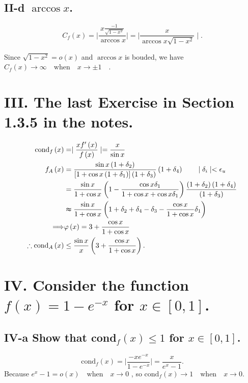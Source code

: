\documentclass[twoside,a4paper]{article}
\begin{document}
\subsection*{II-d \small{$\arccos x$.}}
\[
	C_f\left( x \right)= \mid \frac{x \frac{-1}{\sqrt{1-x^{2}} }}{\arccos x} \mid = \mid \frac{x}{\arccos x \sqrt{1-x^{2}} } \mid 
.\] 

Since $\sqrt{1-x^{2}}=o\left( x \right)  $ and $\arccos x$ is bouded, we have $C_f\left( x \right) \to\infty 
\quad \mathrm{when} \quad x\to \pm 1\quad$.   
\section*{III. \small{The last Exercise in Section 1.3.5 in the notes.}}
\begin{equation*}
	\begin{split}
		\mathrm{cond}_f\left( x \right)&= \mid \frac{xf'\left( x \right) }{f\left( x \right) } \mid 
		= \frac{x}{\sin x}\\
		f_A\left( x \right)&=\frac{\sin x\left( 1+\delta_2 \right) }
		{[1+\cos x\left( 1+\delta_1 \right) ]\left( 1+\delta_3 \right) }\left( 1+\delta_4 \right) 
		\qquad  \mid \delta_i \mid <\epsilon_u \\
				   &=\frac{\sin x}{1+\cos x}\left( 1-\frac{\cos x\delta_1}{1+\cos x+\cos x\delta_1} \right)
				   \frac{\left( 1+\delta_2 \right)\left( 1+\delta_4 \right)  }{\left( 1+\delta_3 \right) }\\
				   &\thickapprox \frac{\sin x}{1+ \cos x}
				   \left( 1+\delta_2+\delta_4-\delta_3-\frac{\cos x}{1+\cos x}\delta_1 \right)\\
		\Longrightarrow&\varphi\left( x \right) =3+\frac{\cos x}{1+\cos x}\\
		\therefore \mathrm{cond}_A\left( x \right)&\le \frac{\sin x}{x}\left( 3+\frac{\cos x}{1+\cos x} \right).  
	\end{split}	
\end{equation*}
\section*{IV. \small{Consider the function $f\left( x \right)=1-e^{-x}$ for $x\in[0,1]$.}}
\subsection*{IV-a \small{Show that cond$_f\left( x \right)\le 1 $ for $x\in[0,1]$.}}
\[
	\mathrm{cond}_f\left( x \right)= \mid \frac{-xe^{-x}}{1-e^{-x}} \mid =\frac{x}{e^{x} - 1} 
.\] 
Because $e^{x}-1=o\left( x \right)\quad \mathrm{when}\quad x\to 0$
, so $\mathrm{cond}_f\left( x \right)\to1\quad \mathrm{when}\quad x\to 0 $. 
\end{document}
